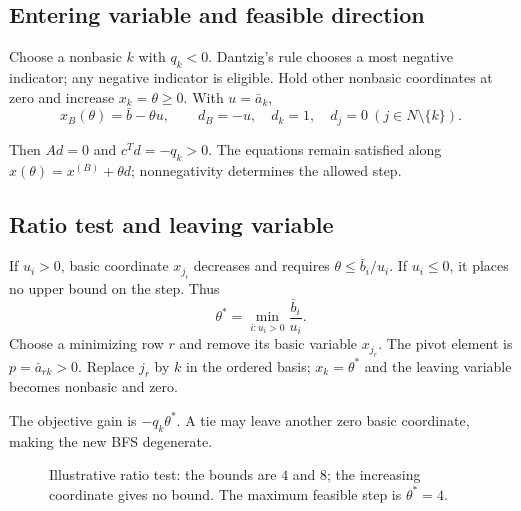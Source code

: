 \documentclass[11pt,a4paper]{article}
\begin{document}
\subsection{Entering variable and feasible direction}
\begin{lecturecore}
  Choose a nonbasic $k$ with $q_k<0$. Dantzig's rule chooses a most negative
  indicator; any negative indicator is eligible. Hold other nonbasic coordinates
  at zero and increase $x_k=\theta\geq0$. With $u=\bar a_k$,
  \begin{equation}\label{eq:direction}
    x_B(\theta)=\bar b-\theta u,\qquad
    d_B=-u,\quad d_k=1,\quad d_j=0\ (j\in N\setminus\{k\}).
  \end{equation}
\end{lecturecore}
Then $Ad=0$ and $c^Td=-q_k>0$. The equations remain satisfied along
$x(\theta)=x^{(B)}+\theta d$; nonnegativity determines the allowed step.

\subsection{Ratio test and leaving variable}
\begin{lecturecore}
  If $u_i>0$, basic coordinate $x_{j_i}$ decreases and requires
  $\theta\leq\bar b_i/u_i$. If $u_i\leq0$, it places no upper bound on the step.
  Thus
  \begin{equation}\label{eq:ratio}
    \theta^*=\min_{i:u_i>0}\frac{\bar b_i}{u_i}.
  \end{equation}
  Choose a minimizing row $r$ and remove its basic variable $x_{j_r}$.
  The pivot element is $p=\bar a_{rk}>0$. Replace $j_r$ by $k$ in the ordered
  basis; $x_k=\theta^*$ and the leaving variable becomes nonbasic and zero.
\end{lecturecore}
The objective gain is $-q_k\theta^*$. A tie may leave another zero basic
coordinate, making the new BFS degenerate.

\begin{figure}[H]
  \centering
  \caption{Illustrative ratio test: the bounds are $4$ and $8$; the increasing
    coordinate gives no bound. The maximum feasible step is $\theta^*=4$.}
  \label{fig:ratio}
\end{figure}
\end{document}
